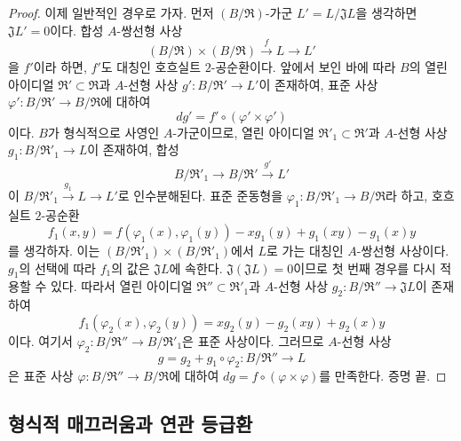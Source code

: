 \begin{proof}
이제 일반적인 경우로 가자. 먼저 $(B/\mathfrak R)$-가군
$L'=L/\mathfrak JL$을 생각하면 $\mathfrak JL'=0$이다. 합성
$A$-쌍선형 사상
\[
  (B/\mathfrak R)\times(B/\mathfrak R)
  \xrightarrow{f}L\longrightarrow L'
\]
을 $f'$이라 하면, $f'$도 대칭인 호흐실트 $2$-공순환이다. 앞에서
보인 바에 따라 $B$의 열린 아이디얼
$\mathfrak R'\subset\mathfrak R$과 $A$-선형 사상
$g':B/\mathfrak R'\to L'$이 존재하여, 표준 사상
$\varphi':B/\mathfrak R'\to B/\mathfrak R$에 대하여
\[
  dg'=f'\circ(\varphi'\times\varphi')
\]
이다. $B$가 형식적으로 사영인 $A$-가군이므로, 열린 아이디얼
$\mathfrak R'_1\subset\mathfrak R'$과 $A$-선형 사상
$g_1:B/\mathfrak R'_1\to L$이 존재하여, 합성
\[
  B/\mathfrak R'_1\longrightarrow
  B/\mathfrak R'\xrightarrow{g'}L'
\]
이
$B/\mathfrak R'_1\xrightarrow{g_1}L\to L'$로 인수분해된다.
표준 준동형을
$\varphi_1:B/\mathfrak R'_1\to B/\mathfrak R$라 하고,
호흐실트 $2$-공순환
\[
  f_1(x,y)=f(\varphi_1(x),\varphi_1(y))
  -xg_1(y)+g_1(xy)-g_1(x)y
\]
를 생각하자. 이는
$(B/\mathfrak R'_1)\times(B/\mathfrak R'_1)$에서 $L$로 가는
대칭인 $A$-쌍선형 사상이다. $g_1$의 선택에 따라 $f_1$의 값은
$\mathfrak JL$에 속한다. $\mathfrak J(\mathfrak JL)=0$이므로
첫 번째 경우를 다시 적용할 수 있다. 따라서 열린 아이디얼
$\mathfrak R''\subset\mathfrak R'_1$과 $A$-선형 사상
$g_2:B/\mathfrak R''\to\mathfrak JL$이 존재하여
\[
  f_1(\varphi_2(x),\varphi_2(y))
  =xg_2(y)-g_2(xy)+g_2(x)y
\]
이다. 여기서
$\varphi_2:B/\mathfrak R''\to B/\mathfrak R'_1$은 표준
사상이다. 그러므로 $A$-선형 사상
\[
  g=g_2+g_1\circ\varphi_2:B/\mathfrak R''\longrightarrow L
\]
은 표준 사상
$\varphi:B/\mathfrak R''\to B/\mathfrak R$에 대하여
$dg=f\circ(\varphi\times\varphi)$를 만족한다. 증명 끝.
\end{proof}

\subsection{형식적 매끄러움과 연관 등급환}
\label{subsection:0.19.5-fr}

